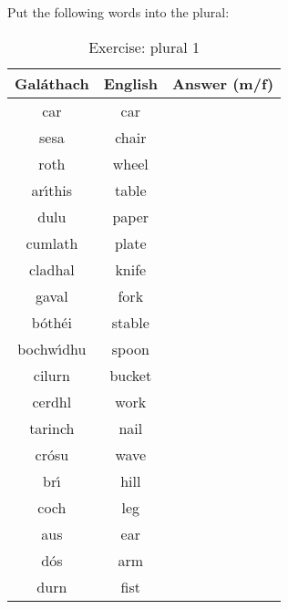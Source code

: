 Put the following words into the plural:
\begin{table}[H]
\centering
\begin{tabular}{|c|c|M{10.0cm}|}
  \toprule
  \textbf{Gal\'{a}thach} & \textbf{English} & \textbf{Answer (m/f)}\\
  \toprule
  car & car & \\
  \midrule
  sesa & chair & \\
  \midrule
  roth & wheel & \\
  \midrule
  ar\'{\i}this & table & \\
  \midrule
  dulu & paper & \\
  \midrule
  cumlath & plate & \\
  \midrule
  cladhal & knife & \\
  \midrule
  gaval & fork & \\
  \midrule
  b\'{o}th\'{e}i & stable & \\
  \midrule
  bochw\'{\i}dhu & spoon & \\
  \midrule
  cilurn & bucket & \\
  \midrule
  cerdhl & work & \\
  \midrule
  tarinch & nail & \\
  \midrule
  cr\'{o}su & wave & \\
  \midrule
  br\'{\i} & hill & \\
  \midrule
  coch & leg & \\
  \midrule
  aus & ear & \\
  \midrule
  d\'{o}s & arm & \\
  \midrule
  durn & fist & \\
  \bottomrule
\end{tabular}
\label{exercise_plural_1}
\caption{Exercise: plural 1}
\end{table}

